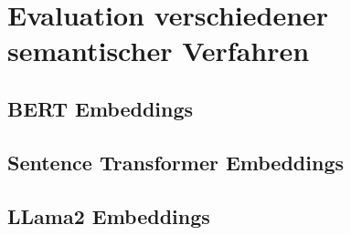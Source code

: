 \chapter{Evaluation verschiedener semantischer Verfahren}\label{ch:experiments}

\section{BERT Embeddings}

\section{Sentence Transformer Embeddings}

\section{LLama2 Embeddings}